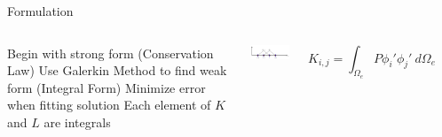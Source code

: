 \begin{frame}{Formulation}
\begin{columns}
\centering
\begin{outline}
  \1 Begin with strong form (Conservation Law)
  \1 Use Galerkin Method to find weak form (Integral Form)
  \1 Minimize error when fitting solution 
  \1 Each element of $K$ and $L$ are integrals
\end{outline}

\centering
\includegraphics[width=5cm]{hat_basis.png}

\vspace{1cm}

$$
K_{i,j} = \int_{\Omega_e} P \phi_i' \phi_j' \ d \Omega_e
$$
\begin{center}
\end{center}
\end{columns}
\end{frame}


